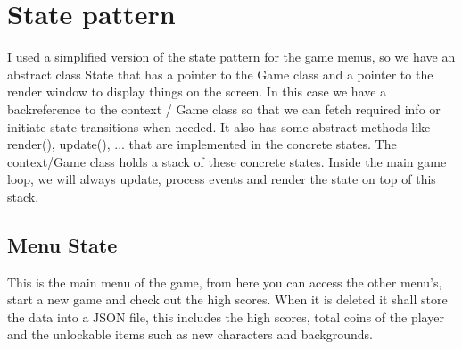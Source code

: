 \documentclass{report}
\begin{document}
\section{State pattern}
I used a simplified version of the state pattern for the game menus, so we have an abstract class State that has a pointer to the Game class and a pointer to the render window to display things on the screen. In this case we have a backreference to the context / Game class so that we can fetch required info or initiate state transitions when needed. It also has some abstract methods like render(), update(), ... that are implemented in the concrete states. The context/Game class holds a stack of these concrete states. Inside the main game loop, we will always update, process events and render the state on top of this stack.

\begin{figure}[!tbp]
  \centering
  \hfill
\end{figure}

\subsection{Menu State}
This is the main menu of the game, from here you can access the other menu's, start a new game and check out the high scores. When it is deleted it shall store the data into a JSON file, this includes the high scores, total coins of the player and the unlockable items such as new characters and backgrounds.
\end{document}
